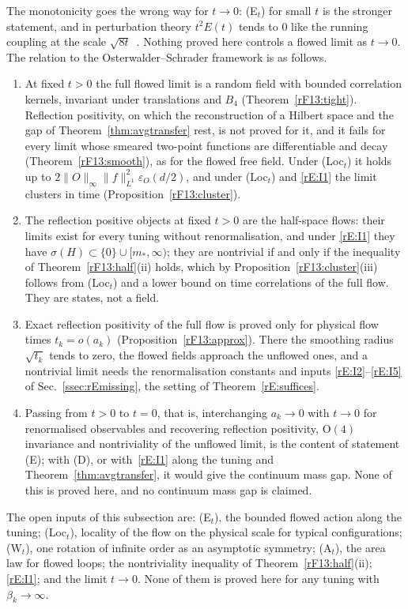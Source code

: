 The monotonicity goes the wrong way for $t\to0$: (E$_t$) for small $t$ is the
stronger statement, and in perturbation theory $t^2E(t)$ tends to $0$ like
the running coupling at the scale $\sqrt{8t}$~\cite[(2.32)]{Lus10}. Nothing
proved here controls a flowed limit as $t\to0$. The relation to the
Osterwalder--Schrader framework is as follows.

\begin{enumerate}[label=\textup{(\arabic*)},leftmargin=*]
\item At fixed $t>0$ the full flowed limit is a random field with bounded
correlation kernels, invariant under translations and $B_4$
(Theorem~\ref{rF13:tight}). Reflection positivity, on which the
reconstruction of a Hilbert space and the gap of
Theorem~\ref{thm:avgtransfer} rest, is not proved for it, and it fails for
every limit whose smeared two-point functions are differentiable and decay
(Theorem~\ref{rF13:smooth}), as for the flowed free field. Under (Loc$_t$)
it holds up to $2\|O\|_\infty\|f\|_{L^1}^2\varepsilon_O(d/2)$, and under
(Loc$_t$) and \ref{rE:I1} the limit clusters in time
(Proposition~\ref{rF13:cluster}).
\item The reflection positive objects at fixed $t>0$ are the half-space
flows: their limits exist for every tuning without renormalisation, and
under \ref{rE:I1} they have $\sigma(H)\subset\{0\}\cup[m_*,\infty)$; they are
nontrivial if and only if the inequality of Theorem~\ref{rF13:half}(ii)
holds, which by Proposition~\ref{rF13:cluster}(iii) follows from (Loc$_t$)
and a lower bound on time correlations of the full flow. They are states,
not a field.
\item Exact reflection positivity of the full flow is proved only for
physical flow times $t_k=o(a_k)$ (Proposition~\ref{rF13:approx}). There the
smoothing radius $\sqrt{t_k}$ tends to zero, the flowed fields approach the
unflowed ones, and a nontrivial limit needs the renormalisation constants
and inputs \ref{rE:I2}--\ref{rE:I5} of Sec.~\ref{ssec:rEmissing}, the setting
of Theorem~\ref{rE:suffices}.
\item Passing from $t>0$ to $t=0$, that is, interchanging $a_k\to0$ with
$t\to0$ for renormalised observables and recovering reflection positivity,
$\mathrm O(4)$ invariance and nontriviality of the unflowed limit, is the
content of statement (E); with (D), or with~\ref{rE:I1} along the tuning
and Theorem~\ref{thm:avgtransfer}, it would give the continuum mass gap.
None of this is proved here, and no continuum mass gap is claimed.
\end{enumerate}

The open inputs of this subsection are: (E$_t$), the bounded flowed action
along the tuning; (Loc$_t$), locality of the flow on the physical scale for
typical configurations; (W$_t$), one rotation of infinite order as an
asymptotic symmetry; (A$_t$), the area law for flowed loops; the
nontriviality inequality of Theorem~\ref{rF13:half}(ii); \ref{rE:I1}; and the
limit $t\to0$. None of them is proved here for any tuning with
$\beta_k\to\infty$.
